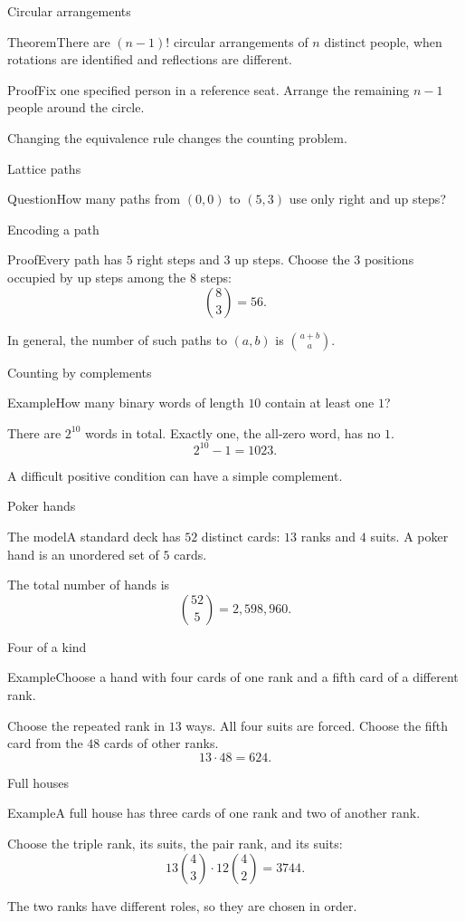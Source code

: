 \documentclass[aspectratio=169,11pt]{beamer}
\newcommand{\Def}[2]{\begin{block}{#1}#2\end{block}}
\newcommand{\Thm}[2]{\begin{block}{#1}#2\end{block}}
\renewcommand{\Proof}[1]{\begin{block}{Proof}\normalsize #1\end{block}}
\newcommand{\Question}[1]{\begin{block}{Question}#1\end{block}}
\renewcommand{\Example}[1]{\begin{block}{Example}#1\end{block}}
\newcommand{\gap}{\par\medskip}
\begin{document}
\begin{frame}{Circular arrangements}
\large
\Thm{Theorem}{There are $(n-1)!$ circular arrangements of $n$ distinct people, when rotations are identified and reflections are different.}
\Proof{Fix one specified person in a reference seat. Arrange the remaining $n-1$ people around the circle.}
\gap Changing the equivalence rule changes the counting problem.
\end{frame}
\begin{frame}{Lattice paths}
\large
\begin{center}\end{center}
\Question{How many paths from $(0,0)$ to $(5,3)$ use only right and up steps?}
\end{frame}
\begin{frame}{Encoding a path}
\large
\Proof{Every path has $5$ right steps and $3$ up steps. Choose the $3$ positions occupied by up steps among the $8$ steps:
\[\binom83=56.\]}
\gap In general, the number of such paths to $(a,b)$ is $\binom{a+b}{a}$.
\end{frame}
\begin{frame}{Counting by complements}
\large
\Example{How many binary words of length $10$ contain at least one $1$?}
\gap There are $2^{10}$ words in total. Exactly one, the all-zero word, has no $1$.
\[2^{10}-1=1023.\]
\gap A difficult positive condition can have a simple complement.
\end{frame}
\begin{frame}{Poker hands}
\large
\Def{The model}{A standard deck has $52$ distinct cards: $13$ ranks and $4$ suits. A poker hand is an unordered set of $5$ cards.}
\gap The total number of hands is
\[\binom{52}{5}=2,598,960.\]
\end{frame}
\begin{frame}{Four of a kind}
\large
\Example{Choose a hand with four cards of one rank and a fifth card of a different rank.}
\gap Choose the repeated rank in $13$ ways. All four suits are forced. Choose the fifth card from the $48$ cards of other ranks.
\[13\cdot48=624.\]
\end{frame}
\begin{frame}{Full houses}
\large
\Example{A full house has three cards of one rank and two of another rank.}
\gap Choose the triple rank, its suits, the pair rank, and its suits:
\[13\binom43\cdot12\binom42=3744.\]
\gap The two ranks have different roles, so they are chosen in order.
\end{frame}
\end{document}
